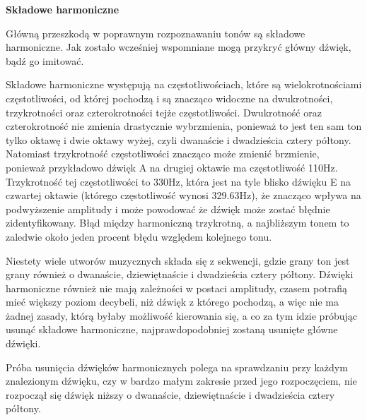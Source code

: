 \noindent\textbf{Składowe harmoniczne}

Główną przeszkodą w poprawnym rozpoznawaniu tonów są składowe harmoniczne. Jak zostało wcześniej wspomniane mogą przykryć główny dźwięk, bądź go imitować. 

Składowe harmoniczne występują na częstotliwościach, które są wielokrotnościami częstotliwości, od której pochodzą i są znacząco widoczne na dwukrotności, trzykrotności oraz czterokrotności tejże częstotliwości. Dwukrotność oraz czterokrotność nie zmienia drastycznie wybrzmienia, ponieważ to jest ten sam ton tylko oktawę i dwie oktawy wyżej, czyli dwanaście i dwadzieścia cztery półtony. Natomiast trzykrotność częstotliwości znacząco może zmienić brzmienie, ponieważ przykładowo dźwięk A na drugiej oktawie ma częstotliwość 110Hz. Trzykrotność tej częstotliwości to 330Hz, która jest na tyle blisko dźwięku E na czwartej oktawie (którego częstotliwość wynosi 329.63Hz), że znacząco wpływa na podwyższenie amplitudy i może powodować że dźwięk może zostać błędnie zidentyfikowany. Błąd między harmoniczną trzykrotną, a najbliższym tonem to zaledwie około jeden procent błędu względem kolejnego tonu. 

Niestety wiele utworów muzycznych składa się z sekwencji, gdzie grany ton jest grany również o dwanaście, dziewiętnaście i dwadzieścia cztery półtony. Dźwięki harmoniczne również nie mają zależności w postaci amplitudy, czasem potrafią mieć większy poziom decybeli, niż dźwięk z którego pochodzą, a więc nie ma żadnej zasady, którą byłaby możliwość kierowania się, a co za tym idzie próbując usunąć składowe harmoniczne, najprawdopodobniej zostaną usunięte główne dźwięki.

Próba usunięcia dźwięków harmonicznych polega na sprawdzaniu przy każdym znalezionym dźwięku, czy w bardzo małym zakresie przed jego rozpoczęciem, nie rozpoczął się dźwięk niższy o dwanaście, dziewiętnaście i dwadzieścia cztery półtony.
